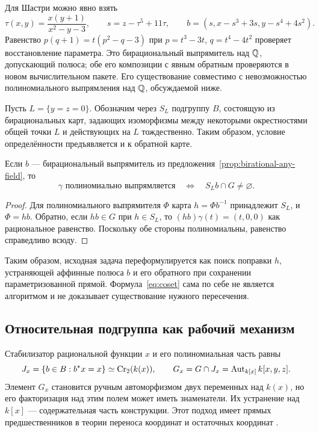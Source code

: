 Для Шастри можно явно взять
\[
 \tau(x,y)=\frac{x(y+1)}{x^2-y-3},\qquad
 s=z-\tau^5+11\tau,\qquad
 b=(s,x-s^3+3s,y-s^4+4s^2).
\]
Равенство $p(q+1)=t(p^2-q-3)$ при $p=t^3-3t$, $q=t^4-4t^2$
проверяет восстановление параметра. Это бирациональный выпрямитель
над ${\mathbb Q}$, допускающий полюса; обе его композиции с явным обратным
проверяются в новом вычислительном пакете. Его существование совместимо
с невозможностью полиномиального выпрямления над ${\mathbb Q}$, обсуждаемой ниже.

Пусть $L=\{y=z=0\}$. Обозначим через $S_L$ подгруппу $B$,
состоящую из бирациональных карт, задающих изоморфизмы между некоторыми
окрестностями общей точки $L$ и действующих на $L$ тождественно.
Таким образом, условие определённости предъявляется и к обратной карте.

\begin{proposition}\label{prop:coset}
Если $b$ --- бирациональный выпрямитель из
предложения~\ref{prop:birational-any-field}, то
\begin{equation}\label{eq:coset}
 \gamma\text{ полиномиально выпрямляется}
 \quad\Longleftrightarrow\quad S_Lb\cap G\ne\varnothing.
\end{equation}
\end{proposition}
\begin{proof}
Для полиномиального выпрямителя $\Phi$ карта $h=\Phi b^{-1}$
принадлежит $S_L$, и $\Phi=hb$. Обратно, если $hb\in G$ при
$h\in S_L$, то $(hb)\gamma(t)=(t,0,0)$ как рациональное равенство.
Поскольку обе стороны полиномиальны, равенство справедливо всюду.
\end{proof}
Таким образом, исходная задача переформулируется как поиск поправки
$h$, устраняющей аффинные полюса $b$ и его обратного при сохранении
параметризованной прямой. Формула~\eqref{eq:coset} сама по себе не
является алгоритмом и не доказывает существование нужного пересечения.

\subsection{Относительная подгруппа как рабочий механизм}

Стабилизатор рациональной функции $x$ и его полиномиальная часть равны
\[
 J_x=\{b\in B:b^*x=x\}\simeq\operatorname{Cr}_2(k(x)),\qquad
 G_x=G\cap J_x=\operatorname{Aut}_{k[x]}k[x,y,z].
\]
Элемент $G_x$ становится ручным автоморфизмом двух переменных над
$k(x)$, но его факторизация над этим полем может иметь знаменатели.
Их устранение над $k[x]$ --- содержательная часть конструкции.
Этот подход имеет прямых предшественников в теории переноса координат
и остаточных координат \cite{EV2001,Lewis2024}.


